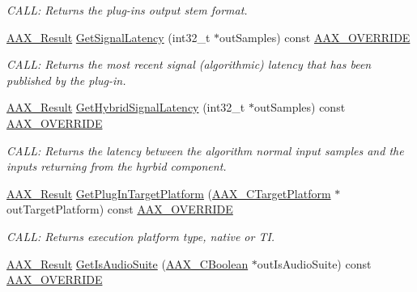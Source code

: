 \begin{DoxyCompactItemize}
\begin{DoxyCompactList}\small\item\em C\+A\+LL\+: Returns the plug-\/in\textquotesingle{}s output stem format. \end{DoxyCompactList}\item 
\mbox{\hyperlink{a00392_a4d8f69a697df7f70c3a8e9b8ee130d2f}{A\+A\+X\+\_\+\+Result}} \mbox{\hyperlink{a01905_ab73ab5f51350ae61a73542231948c81c}{Get\+Signal\+Latency}} (int32\+\_\+t $\ast$out\+Samples) const \mbox{\hyperlink{a00392_ac2f24a5172689ae684344abdcce55463}{A\+A\+X\+\_\+\+O\+V\+E\+R\+R\+I\+DE}}
\begin{DoxyCompactList}\small\item\em C\+A\+LL\+: Returns the most recent signal (algorithmic) latency that has been published by the plug-\/in. \end{DoxyCompactList}\item 
\mbox{\hyperlink{a00392_a4d8f69a697df7f70c3a8e9b8ee130d2f}{A\+A\+X\+\_\+\+Result}} \mbox{\hyperlink{a01905_abc03b972e785569e1a0e89a12a6ed372}{Get\+Hybrid\+Signal\+Latency}} (int32\+\_\+t $\ast$out\+Samples) const \mbox{\hyperlink{a00392_ac2f24a5172689ae684344abdcce55463}{A\+A\+X\+\_\+\+O\+V\+E\+R\+R\+I\+DE}}
\begin{DoxyCompactList}\small\item\em C\+A\+LL\+: Returns the latency between the algorithm normal input samples and the inputs returning from the hyrbid component. \end{DoxyCompactList}\item 
\mbox{\hyperlink{a00392_a4d8f69a697df7f70c3a8e9b8ee130d2f}{A\+A\+X\+\_\+\+Result}} \mbox{\hyperlink{a01905_abb34f17e64d4e50ac8cabf8f47639994}{Get\+Plug\+In\+Target\+Platform}} (\mbox{\hyperlink{a00392_a8f2cefa455217fa9f3ce190fe5fd8033}{A\+A\+X\+\_\+\+C\+Target\+Platform}} $\ast$out\+Target\+Platform) const \mbox{\hyperlink{a00392_ac2f24a5172689ae684344abdcce55463}{A\+A\+X\+\_\+\+O\+V\+E\+R\+R\+I\+DE}}
\begin{DoxyCompactList}\small\item\em C\+A\+LL\+: Returns execution platform type, native or TI. \end{DoxyCompactList}\item 
\mbox{\hyperlink{a00392_a4d8f69a697df7f70c3a8e9b8ee130d2f}{A\+A\+X\+\_\+\+Result}} \mbox{\hyperlink{a01905_a3d3bd957f2b2f863333deadf5b8e6c6c}{Get\+Is\+Audio\+Suite}} (\mbox{\hyperlink{a00392_aa216506530f1d19a2965931ced2b274b}{A\+A\+X\+\_\+\+C\+Boolean}} $\ast$out\+Is\+Audio\+Suite) const \mbox{\hyperlink{a00392_ac2f24a5172689ae684344abdcce55463}{A\+A\+X\+\_\+\+O\+V\+E\+R\+R\+I\+DE}}

\end{DoxyCompactItemize}
